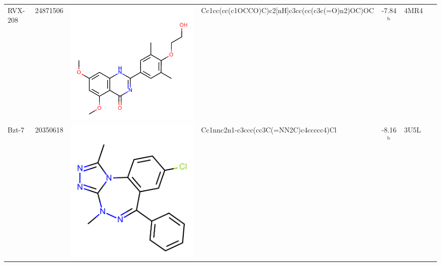 \documentclass[aps,pre,twocolumn,nofootinbib,superscriptaddress,10pt, final,tightenlines]{revtex4-1}
\begin{document}
\begin{table}
\begin{center}
\begin{tabular}{llp{2cm}>{\ttfamily}lS[table-format=-1.2, table-figures-uncertainty=1]ll}
RVX-208                      & 24871506                               & \parbox[c]{1em}{\includegraphics[scale=0.15]{figures/new-bromo/24871506.pdf}} & Cc1cc(cc(c1OCCO)C)c2[nH]c3cc(cc(c3c(=O)n2)OC)OC                  & -7.84$^{\rm b}$                               & 4MR4~\cite{Picaud:2013:PNAS}               & \cite{Picaud:2013:PNAS}                 \\ 
Bzt-7                        & 20350618                               & \parbox[c]{1em}{\includegraphics[scale=0.15]{figures/new-bromo/20350618.pdf}} & Cc1nnc2n1-c3ccc(cc3C(=NN2C)c4ccccc4)Cl                           & -8.16$^{\rm b}$                               & 3U5L~\cite{Fill:2012:Bioorg.Med.Chem.}     & \cite{Fill:2012:Bioorg.Med.Chem.}       \\ 

\end{tabular}
\end{center}
\end{table}
\end{document}
